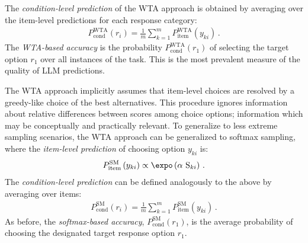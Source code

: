 \documentclass[fleqn]{article}
\begin{document}
The \emph{condition-level prediction} of the WTA approach is obtained by averaging over the item-level predictions for each response category:
%
\begin{align*}
  P_{\text{cond}}^{\text{WTA}}\left(r_{i} \right) = \frac{1}{m} \sum_{k = 1}^{m} P_{\text{item}}^{\text{WTA}} \left(y_{ki} \right)\,.
\end{align*}
%
The \emph{WTA-based accuracy} is the probability $P_{\text{cond}}^{\text{WTA}}\left(r_{1} \right)$ of selecting the target option $r_{1}$ over all instances of the task.
This is the most prevalent measure of the quality of LLM predictions.


The WTA approach implicitly assumes that item-level choices are resolved by a greedy-like choice of the best alternatives.
This procedure ignores information about relative differences between scores among choice options; information which may be conceptually and practically relevant.
To generalize to less extreme sampling scenarios, the WTA approach can be generalized to softmax sampling, where the \emph{item-level prediction} of choosing option $y_{ki}$ is:
%
\begin{align*}
P_{\text{item}}^{\text{SM}}\left ( y_{ki} \right ) \propto \expo \left (\alpha \ \text{S}_{ki} \right)\,.
\end{align*}
%
The \emph{condition-level prediction} can be defined analogously to the above by averaging over items:
\begin{align*}
  P_{\text{cond}}^{\text{SM}}\left(r_{i} \right) = \frac{1}{m} \sum_{k = 1}^{m} P_{\text{item}}^{\text{SM}} \left(y_{ki} \right)\,.
\end{align*}
As before, the \emph{softmax-based accuracy}, $P_{\text{cond}}^{\text{SM}}\left(r_{1} \right)$, is the average probability of choosing the designated target response option $r_{1}$.
\end{document}
